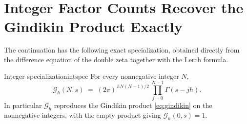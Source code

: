 \documentclass[11pt,letterpaper]{article}
\newcommand{\Gc}{\mathcal{G}}               %
\begin{document}
\section{Integer Factor Counts Recover the Gindikin Product Exactly}
\label{sec:intspec}

The continuation has the following exact specialization, obtained directly from
the difference equation of the double zeta together with the Lerch formula.


\begin{theorem}{Integer specialization}{intspec}
For every nonnegative integer $N$,
\begin{equation}
  \Gc_h(N,s)\;=\;(2\pi)^{\,h N(N-1)/2}\,\prod_{j=0}^{N-1}\Gamma(s-jh).
  \label{eq:intspec}
\end{equation}
In particular $\Gc_h$ reproduces the Gindikin product \eqref{eq:gindikin} on the
nonnegative integers, with the empty product giving $\Gc_h(0,s)=1$.
\end{theorem}
\end{document}

